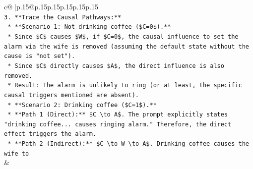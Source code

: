 \documentclass{article}
\begin{document}
{\begin{supertabular}{c@{$\;$}|p{.15\linewidth}@{}p{.15\linewidth}p{.15\linewidth}p{.15\linewidth}p{.15\linewidth}p{.15\linewidth}}
{{{\\ 
\texttt{3.  **Trace the Causal Pathways:**} \\
\texttt{    *   **Scenario 1: Not drinking coffee (\$C=0\$).**} \\
\texttt{        *   Since \$C\$ causes \$W\$, if \$C=0\$, the causal influence to set the alarm via the wife is removed (assuming the default state without the cause is "not set").} \\
\texttt{        *   Since \$C\$ directly causes \$A\$, the direct influence is also removed.} \\
\texttt{        *   Result: The alarm is unlikely to ring (or at least, the specific causal triggers mentioned are absent).} \\
\texttt{    *   **Scenario 2: Drinking coffee (\$C=1\$).**} \\
\texttt{        *   **Path 1 (Direct):** \$C \textbackslash{}to A\$. The prompt explicitly states "drinking coffee... causes ringing alarm." Therefore, the direct effect triggers the alarm.} \\
\texttt{        *   **Path 2 (Indirect):** \$C \textbackslash{}to W \textbackslash{}to A\$. Drinking coffee causes the wife to} \\
            }
        }
    }
    & \\ \\


\end{supertabular}}
\end{document}
